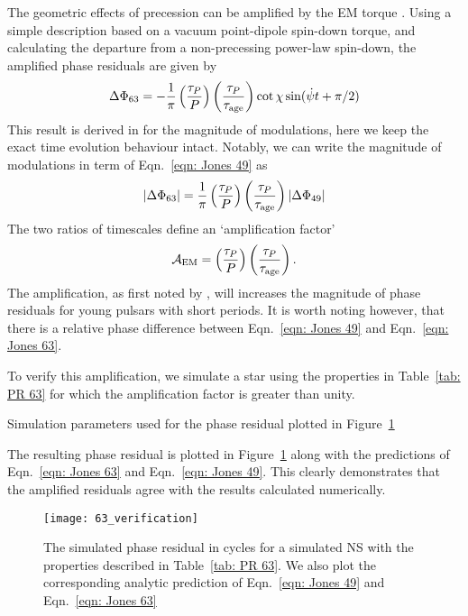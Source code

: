 \documentclass[../full_thesis/full_thesis.tex]{subfiles}
\begin{document}
The geometric effects of precession can be amplified by the EM torque \citep{Cordes1993}.
Using a simple description based on a vacuum point-dipole spin-down torque,
and calculating the departure from a non-precessing power-law spin-down,
the amplified phase residuals are given by
\begin{align}
\Delta\Phi_{63} = -\frac{1}{\pi}\left(\frac{\tau_{P}}{P}\right)
                               \left(\frac{\tau_{P}}{\tau_{\mathrm{age}}}\right)
                               \cot\chi
                               \sin(\dot{\psi} t + \pi/2)
\label{eqn: Jones 63}
\end{align}
This result is derived in \citet{Jones2001} for the magnitude of modulations, here
we keep the exact time evolution behaviour intact. Notably, we can write the
magnitude of modulations in term of Eqn.~\eqref{eqn: Jones 49} as
\begin{equation}
    |\Delta\Phi_{63}| = \frac{1}{\pi}\left(\frac{\tau_{P}}{P}\right)
    \left(\frac{\tau_{P}}{\tau_{\mathrm{age}}}\right)
                                    |\Delta\Phi_{49}|
\label{eqn: Jones 63 mag}
\end{equation}
The two ratios of timescales define an `amplification factor'
\begin{equation}
    \mathcal{A}_{\mathrm{EM}} = \left(\frac{\tau_{P}}{P}\right)
                                \left(\frac{\tau_{P}}{\tau_{\mathrm{age}}}\right).
\label{eqn: EM amplification}
\end{equation}
The amplification, as first noted by \citet{Cordes1993}, will increases the
magnitude of phase residuals for young pulsars with short periods. It is worth
noting however, that there is a relative phase difference between
Eqn.~\eqref{eqn: Jones 49} and Eqn.~\ref{eqn: Jones 63}.

To verify this amplification, we simulate a star using the properties in
Table~\ref{tab: PR 63} for which the amplification factor is greater than
unity.
\begin{table}
\centering

\caption{Simulation parameters used for the phase residual plotted in Figure~\ref{fig: PR 63}}
\label{tab: PR 63}
\end{table}
The resulting phase residual is plotted in Figure~\ref{fig: PR 63} along with the
predictions of Eqn.~\eqref{eqn: Jones 63} and Eqn.~\eqref{eqn: Jones 49}. This
clearly demonstrates that the amplified residuals agree with the results
calculated numerically.
\begin{figure}[htb]
\centering
\texttt{[image: 63\_verification]}
\caption{The simulated phase residual in cycles for a simulated NS with the
properties described in Table~\ref{tab: PR 63}. We also plot the corresponding
analytic prediction of Eqn.~\eqref{eqn: Jones 49} and Eqn.~\eqref{eqn: Jones 63}}
\label{fig: PR 63}
\end{figure}
\end{document}
